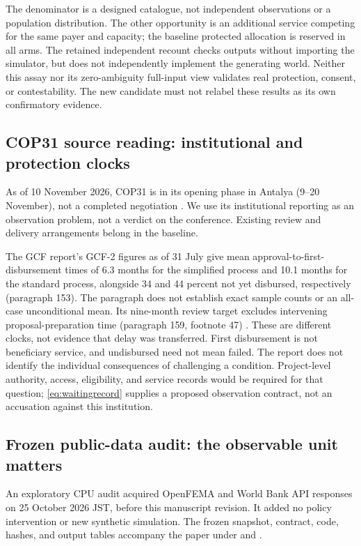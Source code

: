 \documentclass[11pt,a4paper]{article}
\numberwithin{equation}{section}
\theoremstyle{definition}
\theoremstyle{plain}
\theoremstyle{remark}
\begin{document}
The denominator is a designed catalogue, not independent observations or a population distribution. The other opportunity is an additional service competing for the same payer and capacity; the baseline protected allocation is reserved in all arms. The retained independent recount checks outputs without importing the simulator, but does not independently implement the generating world. Neither this assay nor its zero-ambiguity full-input view validates real protection, consent, or contestability. The new candidate must not relabel these results as its own confirmatory evidence.

\subsection{COP31 source reading: institutional and protection clocks}
\label{sec:cop31}

As of 10 November 2026, COP31 is in its opening phase in Antalya (9--20 November), not a completed negotiation \citep{unfccc2026cop31}. We use its institutional reporting as an observation problem, not a verdict on the conference. Existing review and delivery arrangements belong in the baseline.

The GCF report's GCF-2 figures as of 31 July give mean approval-to-first-disbursement times of 6.3 months for the simplified process and 10.1 months for the standard process, alongside 34 and 44 percent not yet disbursed, respectively (paragraph 153). The paragraph does not establish exact sample counts or an all-case unconditional mean. Its nine-month review target excludes intervening proposal-preparation time (paragraph 159, footnote 47) \citep{gcf2026report}. These are different clocks, not evidence that delay was transferred. First disbursement is not beneficiary service, and undisbursed need not mean failed. The report does not identify the individual consequences of challenging a condition. Project-level authority, access, eligibility, and service records would be required for that question; \cref{eq:waitingrecord} supplies a proposed observation contract, not an accusation against this institution.

\subsection{Frozen public-data audit: the observable unit matters}
\label{sec:descriptive}

An exploratory CPU audit acquired OpenFEMA and World Bank API responses on 25 October 2026 JST, before this manuscript revision. It added no policy intervention or new synthetic simulation. The frozen snapshot, contract, code, hashes, and output tables accompany the paper under  and .
\end{document}
